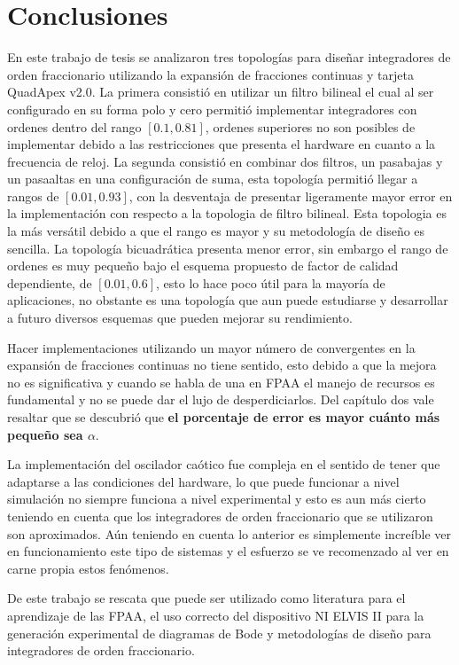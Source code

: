 \chapter{Conclusiones}
	
	En este trabajo de tesis se analizaron tres topologías para diseñar integradores de orden fraccionario utilizando la expansión de fracciones continuas y tarjeta QuadApex v2.0. La primera consistió en utilizar un filtro bilineal el cual al ser configurado en su forma polo y cero permitió implementar integradores con ordenes dentro del rango $[0.1, 0.81]$, ordenes superiores no son posibles de implementar debido a las restricciones que presenta el hardware en cuanto a la frecuencia de reloj. La segunda consistió en combinar dos filtros, un pasabajas y un pasaaltas en una configuración de suma, esta topología permitió llegar a rangos de $[0.01, 0.93]$, con la desventaja de presentar ligeramente mayor error en la implementación con respecto a la topologia de filtro bilineal. Esta topologia es la más versátil debido a que el rango es mayor y su metodología de diseño es sencilla. La topología bicuadrática presenta  menor error, sin embargo el rango de ordenes es muy pequeño bajo el esquema propuesto de factor de calidad dependiente, de $[0.01, 0.6]$, esto lo hace poco útil para la mayoría de aplicaciones, no obstante es una topología que aun puede estudiarse y desarrollar a futuro diversos esquemas que pueden mejorar su rendimiento.
	
	Hacer implementaciones utilizando un mayor número de convergentes en la expansión de fracciones continuas no tiene sentido, esto debido a que la mejora no es significativa y cuando se habla de una en FPAA el manejo de recursos es fundamental y no se puede dar el lujo de desperdiciarlos. Del capítulo dos vale resaltar que se descubrió que \textbf{el porcentaje de error es mayor cuánto más pequeño sea $\alpha$}.
	
	La implementación del oscilador caótico fue compleja en el sentido de tener que adaptarse a las condiciones del hardware, lo que puede funcionar a nivel simulación no siempre funciona a nivel experimental y esto es aun más cierto teniendo en cuenta que los integradores de orden fraccionario que se utilizaron son aproximados. Aún teniendo en cuenta lo anterior es simplemente increíble ver en funcionamiento este tipo de sistemas y el esfuerzo se ve recomenzado al ver en carne propia estos fenómenos.
	
	De este trabajo se rescata que puede ser utilizado como literatura para el aprendizaje de las FPAA, el uso correcto del dispositivo NI ELVIS II para la generación experimental de diagramas de Bode y metodologías de diseño para integradores de orden fraccionario.
	
